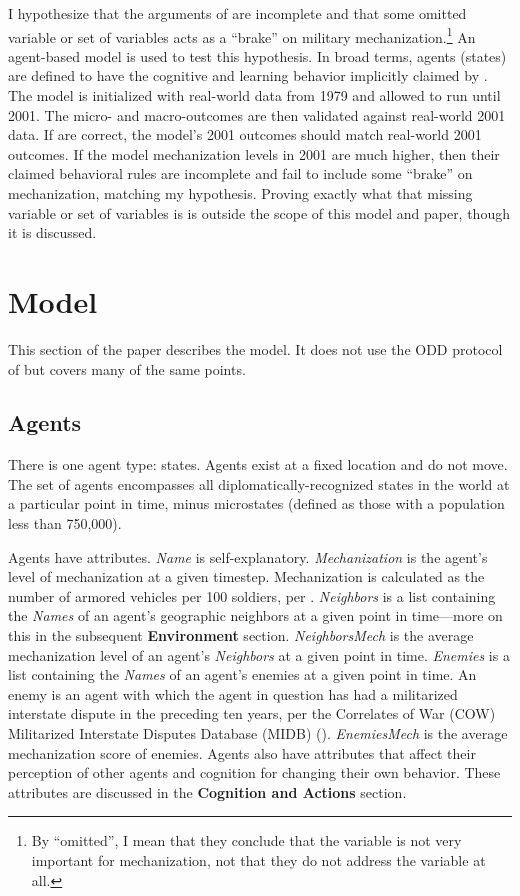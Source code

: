\documentclass{article}
\begin{document}
I hypothesize that the arguments of \cite{sechser2010army} are incomplete and
that some omitted variable or set of variables acts as a ``brake'' on military
mechanization.\footnote{By ``omitted'', I mean that they conclude that the variable
is not very important for mechanization, not that they do not address the
variable at all.} An agent-based model is used to test this hypothesis. In broad
terms, agents (states) are defined to have the cognitive and learning behavior
implicitly claimed by \cite{sechser2010army}. The model is initialized with
real-world data from 1979 and allowed to run until 2001. The micro- and
macro-outcomes are then validated against real-world 2001 data. If
\cite{sechser2010army} are correct, the model's 2001 outcomes should match
real-world 2001 outcomes. If the model mechanization levels in 2001 are much
higher, then their claimed behavioral rules are incomplete and fail to include
some ``brake'' on mechanization, matching my hypothesis. Proving exactly what
that missing variable or set of variables is is outside the scope of this model
and paper, though it is discussed.

\section{Model}

This section of the paper describes the model. It does not use the ODD protocol
of \cite{grimm2006standard} but covers many of the same points.

\subsection{Agents}

There is one agent type: states. Agents exist at a fixed location and do not
move. The set of agents encompasses all diplomatically-recognized 
states in the world at a particular point in time, minus microstates (defined as
those with a population less than 750,000).

Agents have attributes. \textit{Name} is self-explanatory.
\textit{Mechanization} is the agent's level of mechanization at a given
timestep. Mechanization is calculated as the number of armored vehicles per 100
soldiers, per \cite{sechser2010army}. \textit{Neighbors} is a list containing
the \textit{Names} of an agent's geographic neighbors at a given point in
time---more on this in the subsequent \textbf{Environment} section. \textit{NeighborsMech} is the
average mechanization level of an agent's \textit{Neighbors} at a given point in
time. \textit{Enemies} is a list containing the \textit{Names} of an agent's
enemies at a given point in time. An enemy is an agent with which the agent in
question has had a militarized interstate dispute in the preceding ten years,
per the Correlates of War (COW) Militarized Interstate Disputes Database (MIDB)
(\cite{cow_midb}). \textit{EnemiesMech} is the average mechanization score of
enemies. Agents also have attributes that affect their
perception of other agents and cognition for changing their own behavior. These
attributes are discussed in the \textbf{Cognition and Actions} section.
\end{document}
